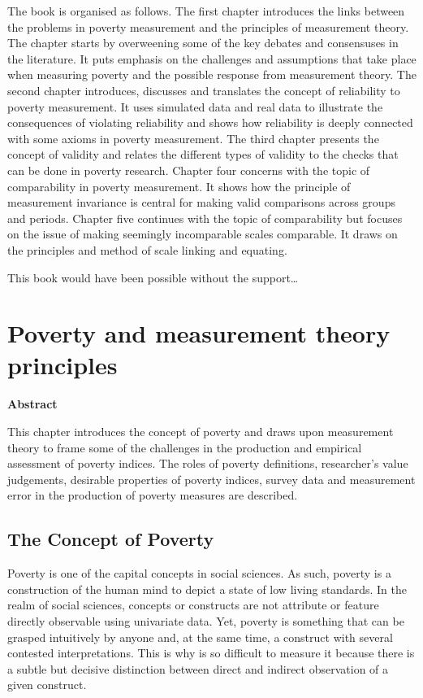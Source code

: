 \documentclass[]{book}
\begin{document}
The book is organised as follows. The first chapter introduces the links between the problems in poverty measurement and the principles of measurement theory. The chapter starts by overweening some of the key debates and consensuses in the literature. It puts emphasis on the challenges and assumptions that take place when measuring poverty and the possible response from measurement theory. The second chapter introduces, discusses and translates the concept of reliability to poverty measurement. It uses simulated data and real data to illustrate the consequences of violating reliability and shows how reliability is deeply connected with some axioms in poverty measurement. The third chapter presents the concept of validity and relates the different types of validity to the checks that can be done in poverty research. Chapter four concerns with the topic of comparability in poverty measurement. It shows how the principle of measurement invariance is central for making valid comparisons across groups and periods. Chapter five continues with the topic of comparability but focuses on the issue of making seemingly incomparable scales comparable. It draws on the principles and method of scale linking and equating.

This book would have been possible without the support\ldots{}

\hypertarget{Chapter-1}{%
\chapter{Poverty and measurement theory principles}\label{Chapter-1}}

\textbf{Abstract}

This chapter introduces the concept of poverty and draws upon measurement theory to frame some of the challenges in the production and empirical assessment of poverty indices. The roles of poverty definitions, researcher's value judgements, desirable properties of poverty indices, survey data and measurement error in the production of poverty measures are described.

\hypertarget{the-concept-of-poverty}{%
\section{The Concept of Poverty}\label{the-concept-of-poverty}}

Poverty is one of the capital concepts in social sciences. As such, poverty is a construction of the human mind to depict a state of low living standards. In the realm of social sciences, concepts or constructs are not attribute or feature directly observable using univariate data. Yet, poverty is something that can be grasped intuitively by anyone and, at the same time, a construct with several contested interpretations. This is why is so difficult to measure it because there is a subtle but decisive distinction between direct and indirect observation of a given construct.
\end{document}
